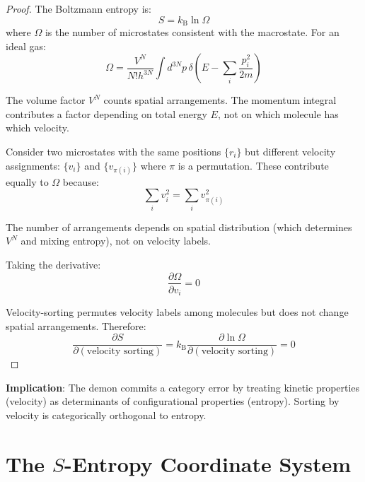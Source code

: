 \documentclass[twocolumn,showpacs,preprintnumbers,amsmath,amssymb,prd]{revtex4-2}
\theoremstyle{definition}
\theoremstyle{remark}
\newcommand{\kB}{k_{\mathrm{B}}}
\begin{document}
\begin{proof}
The Boltzmann entropy is:
\begin{equation}
S = \kB \ln \Omega
\end{equation}
where $\Omega$ is the number of microstates consistent with the macrostate. For an ideal gas:
\begin{equation}
\Omega = \frac{V^N}{N! h^{3N}} \int d^{3N}p \, \delta\left(E - \sum_i \frac{p_i^2}{2m}\right)
\end{equation}

The volume factor $V^N$ counts spatial arrangements. The momentum integral contributes a factor depending on total energy $E$, not on which molecule has which velocity.

Consider two microstates with the same positions $\{r_i\}$ but different velocity assignments: $\{v_i\}$ and $\{v_{\pi(i)}\}$ where $\pi$ is a permutation. These contribute equally to $\Omega$ because:
\begin{equation}
\sum_i v_i^2 = \sum_i v_{\pi(i)}^2
\end{equation}

The number of arrangements depends on spatial distribution (which determines $V^N$ and mixing entropy), not on velocity labels.

Taking the derivative:
\begin{equation}
\frac{\partial \Omega}{\partial v_i} = 0
\end{equation}

Velocity-sorting permutes velocity labels among molecules but does not change spatial arrangements. Therefore:
\begin{equation}
\frac{\partial S}{\partial (\text{velocity sorting})} = \kB \frac{\partial \ln \Omega}{\partial (\text{velocity sorting})} = 0
\end{equation}
\end{proof}

\textbf{Implication}: The demon commits a category error by treating kinetic properties (velocity) as determinants of configurational properties (entropy). Sorting by velocity is categorically orthogonal to entropy.

\section{The $S$-Entropy Coordinate System}
\label{sec:sentropy}
\end{document}
